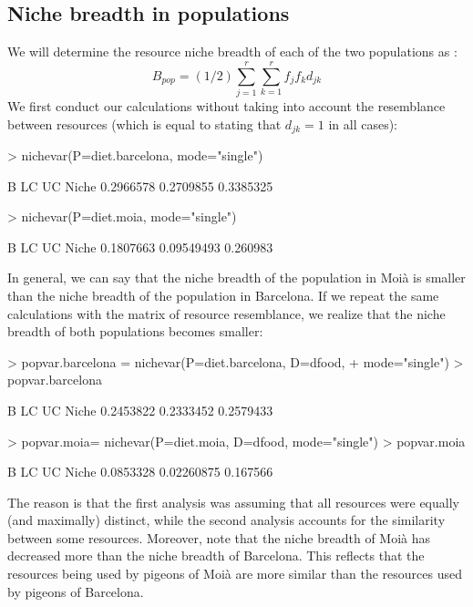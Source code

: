 \documentclass[11pt,a4paper]{article}
\begin{document}
\subsection{Niche breadth in populations}
We will determine the resource niche breadth of each of the two populations as \citep{DeCaceres2011}: 
\[
B_{pop} = (1/2)\sum_{j=1}^r\sum_{k=1}^r{f_jf_kd_{jk}}
\]
We first conduct our calculations without taking into account the resemblance between resources (which is equal to stating that $d_{jk}=1$ in all cases):
\begin{Schunk}
\begin{Sinput}
> nichevar(P=diet.barcelona, mode="single")
\end{Sinput}
\begin{Soutput}
              B        LC        UC
Niche 0.2966578 0.2709855 0.3385325
\end{Soutput}
\begin{Sinput}
> nichevar(P=diet.moia, mode="single")
\end{Sinput}
\begin{Soutput}
              B         LC       UC
Niche 0.1807663 0.09549493 0.260983
\end{Soutput}
\end{Schunk}
In general, we can say that the niche breadth of the population in Moià is smaller than the niche breadth of the population in Barcelona. If we repeat the same calculations with the matrix of resource resemblance, we realize that the niche breadth of both populations becomes smaller:
\begin{Schunk}
\begin{Sinput}
> popvar.barcelona = nichevar(P=diet.barcelona, D=dfood, 
+                             mode="single")
> popvar.barcelona
\end{Sinput}
\begin{Soutput}
              B        LC        UC
Niche 0.2453822 0.2333452 0.2579433
\end{Soutput}
\begin{Sinput}
> popvar.moia= nichevar(P=diet.moia, D=dfood, mode="single")
> popvar.moia
\end{Sinput}
\begin{Soutput}
              B         LC       UC
Niche 0.0853328 0.02260875 0.167566
\end{Soutput}
\end{Schunk}
The reason is that the first analysis was assuming that all resources were equally (and maximally) distinct, while the second analysis accounts for the similarity between some resources. Moreover, note that the niche breadth of Moià has decreased more than the niche breadth of Barcelona. This reflects that the resources being used by pigeons of Moià are more similar than the resources used by pigeons of Barcelona.
\end{document}
